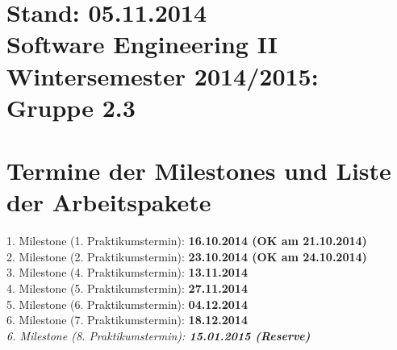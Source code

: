 \documentclass[a4paper,10pt]{article}
\begin{document}
  \section*{\small{\flushright Stand: 05.11.2014\\ \flushleft Software Engineering II \\ Wintersemester 2014/2015: Gruppe 2.3}}
  \section*{Termine der Milestones und Liste der Arbeitspakete}
  1. Milestone (1. Praktikumstermin): \textbf{16.10.2014 \textbar \space (OK am 21.10.2014)}\\
  2. Milestone (2. Praktikumstermin): \textbf{23.10.2014 \textbar \space (OK am 24.10.2014)}\\
  3. Milestone (4. Praktikumstermin): \textbf{13.11.2014}\\
  4. Milestone (5. Praktikumstermin): \textbf{27.11.2014}\\
  5. Milestone (6. Praktikumstermin): \textbf{04.12.2014}\\
  6. Milestone (7. Praktikumstermin): \textbf{18.12.2014}\\
  \textit{6. Milestone (8. Praktikumstermin): \textbf{15.01.2015 (Reserve)}}\\
\end{document}
